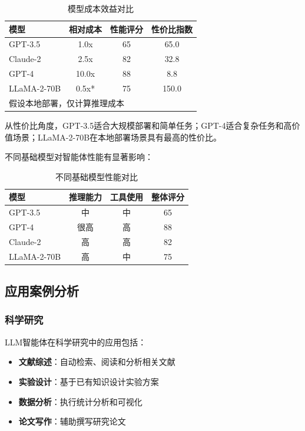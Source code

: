 \begin{table}[htbp]
    \centering
    \caption{模型成本效益对比}
    \label{tab:cost-performance}
    \begin{tabular}{@{}lccc@{}}
        \toprule
        \textbf{模型} & \textbf{相对成本} & \textbf{性能评分} & \textbf{性价比指数} \\
        \midrule
        GPT-3.5 & 1.0x & 65 & 65.0 \\
        Claude-2 & 2.5x & 82 & 32.8 \\
        GPT-4 & 10.0x & 88 & 8.8 \\
        LLaMA-2-70B & 0.5x* & 75 & 150.0 \\
        \bottomrule
        \multicolumn{4}{l}{\small *假设本地部署，仅计算推理成本}
    \end{tabular}
\end{table}

从性价比角度，GPT-3.5适合大规模部署和简单任务；GPT-4适合复杂任务和高价值场景；LLaMA-2-70B在本地部署场景具有最高的性价比。

不同基础模型对智能体性能有显著影响：

\begin{table}[htbp]
    \centering
    \caption{不同基础模型性能对比}
    \label{tab:model-performance}
    \begin{tabular}{@{}lccc@{}}
        \toprule
        \textbf{模型} & \textbf{推理能力} & \textbf{工具使用} & \textbf{整体评分} \\
        \midrule
        GPT-3.5 & 中 & 中 & 65 \\
        GPT-4 & 很高 & 高 & 88 \\
        Claude-2 & 高 & 高 & 82 \\
        LLaMA-2-70B & 高 & 中 & 75 \\
        \bottomrule
    \end{tabular}
\end{table}

\subsection{应用案例分析}

\subsubsection{科学研究}

LLM智能体在科学研究中的应用包括：

\begin{itemize}[leftmargin=2em]
    \item \textbf{文献综述}：自动检索、阅读和分析相关文献
    \item \textbf{实验设计}：基于已有知识设计实验方案
    \item \textbf{数据分析}：执行统计分析和可视化
    \item \textbf{论文写作}：辅助撰写研究论文
\end{itemize}

